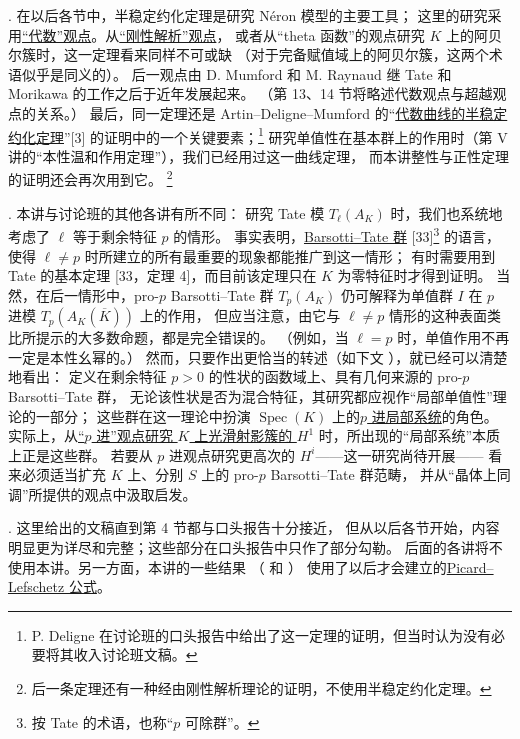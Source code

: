 . 在以后各节中，半稳定约化定理是研究 N\'eron 模型的主要工具；
这里的研究采用\underline{“代数”观点}。从\underline{“刚性解析”观点}，
或者从“theta 函数”的观点研究 $K$ 上的阿贝尔簇时，这一定理看来同样不可或缺
（对于完备赋值域上的阿贝尔簇，这两个术语似乎是同义的）。
后一观点由 D. Mumford 和 M. Raynaud 继 Tate 和 Morikawa 的工作之后于近年发展起来。
（第 13、14 节将略述代数观点与超越观点的关系。）
最后，同一定理还是 Artin--Deligne--Mumford 的“\underline{代数曲线的半稳定约化定理}”[3]
的证明中的一个关键要素；\footnote{P. Deligne 在讨论班的口头报告中给出了这一定理的证明，但当时认为没有必要将其收入讨论班文稿。}
研究单值性在基本群上的作用时（第 V 讲的“本性温和作用定理”），我们已经用过这一曲线定理，
而本讲整性与正性定理  的证明还会再次用到它。
\footnote{后一条定理还有一种经由刚性解析理论的证明，不使用半稳定约化定理。}

. 本讲与讨论班的其他各讲有所不同：
研究 Tate 模 $T_\ell(A_K)$ 时，我们也系统地考虑了 $\ell$ 等于剩余特征 $p$ 的情形。
事实表明，\underline{Barsotti--Tate 群} [33]\footnote{按 Tate 的术语，也称“$p$ 可除群”。}
的语言，使得 $\ell\ne p$ 时所建立的所有最重要的现象都能推广到这一情形；
有时需要用到 Tate 的基本定理 [33，定理 4]，而目前该定理只在 $K$ 为零特征时才得到证明。
当然，在后一情形中，pro-$p$ Barsotti--Tate 群 $T_p(A_K)$ 仍可解释为单值群 $I$ 在
$p$ 进模 $T_p(A_K(\overline K))$ 上的作用，
但应当注意，由它与 $\ell\ne p$ 情形的这种表面类比所提示的大多数命题，都是完全错误的。
（例如，当 $\ell=p$ 时，单值作用不再一定是本性幺幂的。）
然而，只要作出更恰当的转述（如下文 ），就已经可以清楚地看出：
定义在剩余特征 $p>0$ 的性状的函数域上、具有几何来源的 pro-$p$ Barsotti--Tate 群，
无论该性状是否为混合特征，其研究都应视作“局部单值性”理论的一部分；
这些群在这一理论中扮演 $\operatorname{Spec}(K)$ 上的\underline{$p$ 进局部系统}的角色。
实际上，从\underline{“$p$ 进”观点研究 $K$ 上光滑射影簇的 $H^1$} 时，所出现的“局部系统”本质上正是这些群。
若要从 $p$ 进观点研究更高次的 $H^i$——这一研究尚待开展——
看来必须适当扩充 $K$ 上、分别 $S$ 上的 pro-$p$ Barsotti--Tate 群范畴，
并从“晶体上同调”所提供的观点中汲取启发。

. 这里给出的文稿直到第 4 节都与口头报告十分接近，
但从以后各节开始，内容明显更为详尽和完整；这些部分在口头报告中只作了部分勾勒。
后面的各讲将不使用本讲。另一方面，本讲的一些结果
（ 和 ）
使用了以后才会建立的\underline{Picard--Lefschetz 公式}。

